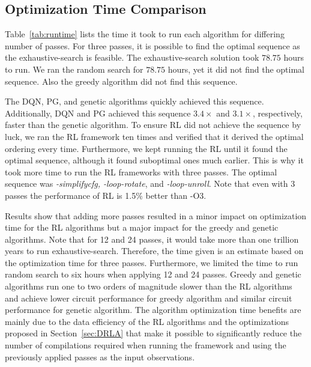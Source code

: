 \subsection{Optimization Time Comparison}

Table~\ref{tab:runtime} lists the time it took to run each algorithm for differing number of passes. For three passes, it is possible to find the optimal sequence as the exhaustive-search is feasible. The exhaustive-search solution took $78.75$ hours to run. We ran the random search for $78.75$ hours, yet it did not find the optimal sequence. Also the greedy algorithm did not find this sequence.


The DQN, PG, and genetic algorithms quickly achieved this sequence. Additionally, DQN and PG achieved this sequence $3.4\times$ and $3.1\times$, respectively, faster than the genetic algorithm. To ensure  RL did not achieve the sequence by luck, we ran the RL framework ten times and verified that it derived the optimal ordering every time. Furthermore, we kept running the RL until it found the optimal sequence, although it found suboptimal ones much earlier. This is why it took more time to run the RL frameworks with three passes.
The optimal sequence was \textit{-simplifycfg, -loop-rotate}, and \textit{-loop-unroll}. Note that even with $3$ passes the performance of RL is 1.5\% better than -O3.

Results show that adding more passes resulted in a minor impact on optimization time for the RL algorithms but a major impact for the greedy and genetic algorithms. Note that for 12 and 24 passes, it would take more than one trillion years to run exhaustive-search. Therefore, the time given is an estimate based on the optimization time for three passes. Furthermore, we limited the time to run random search to six hours when applying 12 and 24 passes. Greedy and genetic algorithms run one to two orders of magnitude slower than the RL algorithms and achieve lower circuit performance for greedy algorithm and similar circuit performance for genetic algorithm. The algorithm optimization time benefits are mainly due to the data efficiency of the RL algorithms and the optimizations proposed in Section~\ref{sec:DRLA} that make it possible to significantly reduce the number of compilations required when running the framework and using the previously applied passes as the input observations. %

